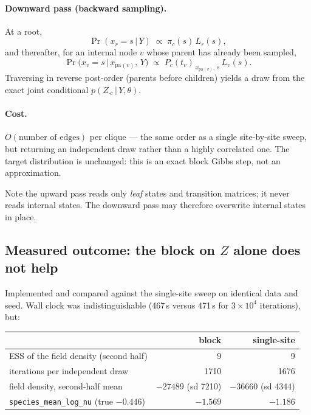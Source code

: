 \documentclass[11pt,a4paper]{article}
\newcommand{\Ys}{Y}
\newcommand{\pa}{\mathrm{pa}}
\newcommand{\given}{\,\vert\,}
\begin{document}
\paragraph{Downward pass (backward sampling).} At a root,
\[
  \Pr(x_{r} = s \given \Ys) \;\propto\; \pi_c(s)\, L_{r}(s),
\]
and thereafter, for an internal node $v$ whose parent has already been sampled,
\[
  \Pr\bigl(x_v = s \given x_{\pa(v)},\, \Ys\bigr) \;\propto\; P_c(t_v)_{\,x_{\pa(v)},\,s}\, L_v(s).
\]
Traversing in reverse post-order (parents before children) yields a draw from the exact
joint conditional $p(Z_{\cdot c} \given \Ys, \theta)$.

\paragraph{Cost.} $O(\text{number of edges})$ per clique --- the same order as a single
site-by-site sweep, but returning an independent draw rather than a highly correlated one.
The target distribution is unchanged: this is an exact block Gibbs step, not an
approximation.

Note the upward pass reads only \emph{leaf} states and transition matrices; it never reads
internal states. The downward pass may therefore overwrite internal states in place.

\subsection{Measured outcome: the block on \texorpdfstring{$Z$}{Z} alone does not help}
\label{sec:blockresult}

Implemented and compared against the single-site sweep on identical data and seed. Wall
clock was indistinguishable (467\,s versus 471\,s for $3\times10^4$ iterations), but:

\begin{center}
\begin{tabular}{lrr}
\toprule
 & block & single-site\\
\midrule
ESS of the field density (second half) & 9 & 9\\
iterations per independent draw        & 1710 & 1676\\
field density, second-half mean        & $-27489$ (sd 7210) & $-36660$ (sd 4344)\\
\texttt{species\_mean\_log\_nu} (true $-0.446$) & $-1.569$ & $-1.186$\\
\bottomrule
\end{tabular}
\end{center}
\end{document}
